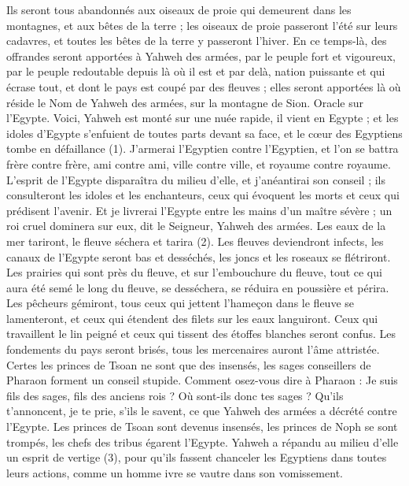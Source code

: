 \begin{multicols}{2}
{Ils seront tous abandonnés aux oiseaux de proie qui demeurent dans les montagnes, et aux bêtes de la terre ; les oiseaux de proie passeront l’été sur leurs cadavres, et toutes les bêtes de la terre y passeront l’hiver.
En ce temps-là, des offrandes seront apportées à Yahweh des armées, par le peuple fort et vigoureux, par le peuple redoutable depuis là où il est et par delà, nation puissante et qui écrase tout, et dont le pays est coupé par des fleuves ; elles seront apportées là où réside le Nom de Yahweh des armées, sur la montagne de Sion.
\VerseOne{}Oracle sur l'Egypte. Voici, Yahweh est monté sur une nuée rapide, il vient en Egypte ; et les idoles d'Egypte s'enfuient de toutes parts devant sa face, et le cœur des Egyptiens tombe en défaillance (1).
J’armerai l'Egyptien contre l'Egyptien, et l’on se battra frère contre frère, ami contre ami, ville contre ville, et royaume contre royaume.
L'esprit de l'Egypte disparaîtra du milieu d'elle, et j’anéantirai son conseil ; ils consulteront les idoles et les enchanteurs, ceux qui évoquent les morts et ceux qui prédisent l’avenir.
Et je livrerai l'Egypte entre les mains d'un maître sévère ; un roi cruel dominera sur eux, dit le Seigneur, Yahweh des armées.
Les eaux de la mer tariront, le fleuve séchera et tarira (2).
Les fleuves deviendront infects, les canaux de l’Egypte seront bas et desséchés, les joncs et les roseaux se flétriront.
Les prairies qui sont près du fleuve, et sur l'embouchure du fleuve, tout ce qui aura été semé le long du fleuve, se desséchera, se réduira en poussière et périra.
Les pêcheurs gémiront, tous ceux qui jettent l'hameçon dans le fleuve se lamenteront, et ceux qui étendent des filets sur les eaux languiront.
Ceux qui travaillent le lin peigné et ceux qui tissent des étoffes blanches seront confus.
Les fondements du pays seront brisés, tous les mercenaires auront l’âme attristée.
Certes les princes de Tsoan ne sont que des insensés, les sages conseillers de Pharaon forment un conseil stupide. Comment osez-vous dire à Pharaon : Je suis fils des sages, fils des anciens rois ?
Où sont-ils donc tes sages ? Qu’ils t'annoncent, je te prie, s'ils le savent, ce que Yahweh des armées a décrété contre l'Egypte.
Les princes de Tsoan sont devenus insensés, les princes de Noph se sont trompés, les chefs des tribus égarent l’Egypte.
Yahweh a répandu au milieu d'elle un esprit de vertige (3), pour qu’ils fassent chanceler les Egyptiens dans toutes leurs actions, comme un homme ivre se vautre dans son vomissement.
}
\end{multicols}
